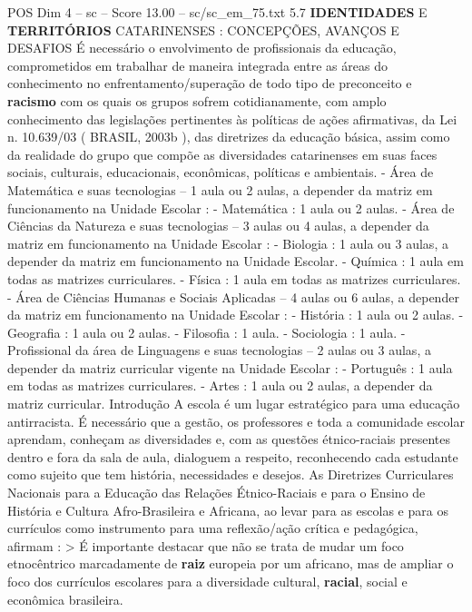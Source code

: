 \begin{textsample}{POS Dim 4 – sc – Score 13.00 – sc/sc\_em\_75.txt}  \label{ex:f4_pos_040}
5.7 \textbf{IDENTIDADES} E \textbf{TERRITÓRIOS} CATARINENSES : CONCEPÇÕES, AVANÇOS E DESAFIOS É necessário o envolvimento de profissionais da educação, comprometidos em trabalhar de maneira integrada entre as áreas do conhecimento no enfrentamento/superação de todo tipo de preconceito e \textbf{racismo} com os quais os grupos sofrem cotidianamente, com amplo conhecimento das legislações pertinentes às políticas de ações afirmativas, da Lei n. 10.639/03 ( BRASIL, 2003b ), das diretrizes da educação básica, assim como da realidade do grupo que compõe as diversidades catarinenses em suas faces sociais, culturais, educacionais, econômicas, políticas e ambientais. - Área de Matemática e suas tecnologias – 1 aula ou 2 aulas, a depender da matriz em funcionamento na Unidade Escolar : - Matemática : 1 aula ou 2 aulas. - Área de Ciências da Natureza e suas tecnologias – 3 aulas ou 4 aulas, a depender da matriz em funcionamento na Unidade Escolar : - Biologia : 1 aula ou 3 aulas, a depender da matriz em funcionamento na Unidade Escolar. - Química : 1 aula em todas as matrizes curriculares. - Física : 1 aula em todas as matrizes curriculares. - Área de Ciências Humanas e Sociais Aplicadas – 4 aulas ou 6 aulas, a depender da matriz em funcionamento na Unidade Escolar : - História : 1 aula ou 2 aulas. - Geografia : 1 aula ou 2 aulas. - Filosofia : 1 aula. - Sociologia : 1 aula. - Profissional da área de Linguagens e suas tecnologias – 2 aulas ou 3 aulas, a depender da matriz curricular vigente na Unidade Escolar : - Português : 1 aula em todas as matrizes curriculares. - Artes : 1 aula ou 2 aulas, a depender da matriz curricular.
Introdução A escola é um lugar estratégico para uma educação antirracista.
É necessário que a gestão, os professores e toda a comunidade escolar aprendam, conheçam as diversidades e, com as questões étnico-raciais presentes dentro e fora da sala de aula, dialoguem a respeito, reconhecendo cada estudante como sujeito que tem história, necessidades e desejos.
As Diretrizes Curriculares Nacionais para a Educação das Relações Étnico-Raciais e para o Ensino de História e Cultura Afro-Brasileira e Africana, ao levar para as escolas e para os currículos como instrumento para uma reflexão/ação crítica e pedagógica, afirmam : > É importante destacar que não se trata de mudar um foco etnocêntrico marcadamente de \textbf{raiz} europeia por um africano, mas de ampliar o foco dos currículos escolares para a diversidade cultural, \textbf{racial}, social e econômica brasileira.

\end{textsample}
